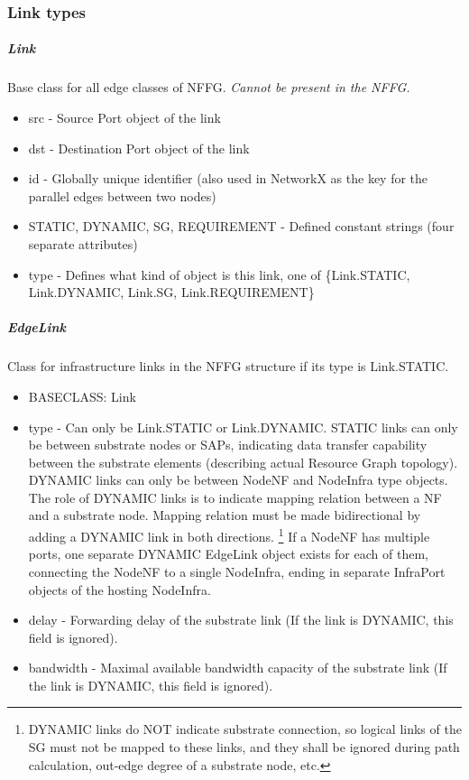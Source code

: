 \documentclass[a4paper,10pt]{scrartcl}
\begin{document}
\subsubsection{Link types}

\subparagraph{Link}
Base class for all edge classes of NFFG. \emph{Cannot be present in the NFFG.}
\begin{itemize}
\item src - Source Port object of the link
\item dst - Destination Port object of the link
\item id - Globally unique identifier (also used in NetworkX as the key for the parallel edges between two nodes)
\item STATIC, DYNAMIC, SG, REQUIREMENT - Defined constant strings (four separate attributes)
\item type - Defines what kind of object is this link, one of \{Link.STATIC, Link.DYNAMIC, Link.SG, Link.REQUIREMENT\}
\end{itemize}

\subparagraph{EdgeLink}
Class for infrastructure links in the NFFG structure if its type is Link.STATIC. 
\begin{itemize}
\item BASECLASS: Link
\item type - Can only be Link.STATIC or Link.DYNAMIC. STATIC links can only be between substrate nodes or SAPs, 
indicating data transfer capability between the substrate elements (describing actual Resource Graph topology).
DYNAMIC links can only be between NodeNF and NodeInfra type objects. 
The role of DYNAMIC links is to indicate mapping relation between a NF and a substrate node. 
Mapping relation must be made bidirectional by adding a DYNAMIC link in both directions.
\footnote{DYNAMIC links do NOT indicate substrate connection, so logical links of the SG must not be mapped to these links, 
and they shall be ignored during path calculation, out-edge degree of a substrate node, etc.}
If a NodeNF has multiple ports, one separate DYNAMIC EdgeLink object exists for each of them, 
connecting the NodeNF to a single NodeInfra, ending in separate InfraPort objects of the hosting NodeInfra.
\item delay - Forwarding delay of the substrate link (If the link is DYNAMIC, this field is ignored). 
\item bandwidth - Maximal available bandwidth capacity of the substrate link (If the link is DYNAMIC, this field is ignored).
\end{itemize}
\end{document}
